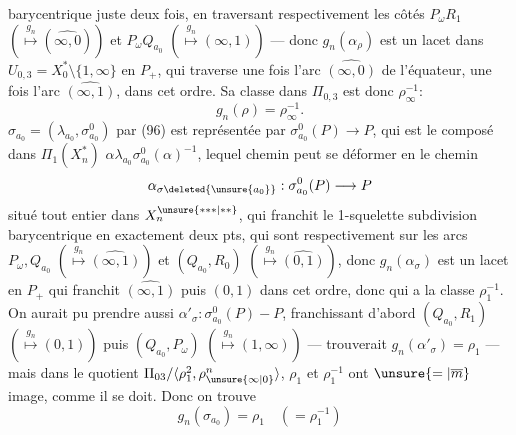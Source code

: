 barycentrique juste deux fois,  en traversant respectivement les côtés $P_\omega R_1$ $(\overset{g_n}\longmapsto(\widehat{\infty,0}))$ et $P_\omega Q_{a_0}$ $(\overset{g_n}\longmapsto(\infty,1))$ — donc $g_n(\alpha_\rho)$ est un lacet dans $U_{0,3}=X_0^*\setminus\{1,\infty\}$  en $P_+$, qui  traverse une fois l'arc $\widehat{(\infty,0)}$ de l'équateur, une fois l'arc $\widehat{(\infty,1)}$, dans cet ordre. Sa classe dans $\Pi_{0,3}$ est donc $\rho_\infty^{-1}$:
\[
\tag{*} g_n(\rho)=\rho_\infty^{-1}.
\]
  $\sigma_{a_0}=(\lambda_{a_0},\sigma^0_{a_0})$ par (96) est représentée par $\sigma^0_{a_0}(P)\longrightarrow P$, qui est le composé dans $\Pi_1(X_n^*)$  $\alpha\lambda_{a_0}\sigma^0_{a_0}(\alpha)^{-1}$, lequel chemin peut se déformer en le chemin 
\[
\alpha_{\sigma\deleted{\unsure{a_0}}}:\sigma^0_{a_0}(P)\longrightarrow P
\]
situé tout entier dans $X_n^{\unsure{***|**}}$, qui franchit le 1-squelette  subdivision barycentrique en exactement deux pts, qui sont respectivement sur les arcs $P_\omega,Q_{a_0}$ $(\overset{g_n}\longmapsto\widehat{(\infty,1)})$ et $(Q_{a_0},R_0)$ $(\overset{g_n}\longmapsto\widehat{(0,1)})$, donc $g_n(\alpha_\sigma)$ est un lacet en $P_+$ qui franchit $\widehat{(\infty,1)}$ puis $\widehat{(0,1)}$ dans cet ordre, donc qui  a la classe $\rho_1^{-1}$. On aurait pu prendre aussi $\alpha'_\sigma:\sigma^0_{a_0}(P)\mathbin{-}P$, franchissant d'abord $(Q_{a_0},R_1)$ $(\overset{g_n}\longmapsto\widehat{(0,1)})$ puis $(Q_{a_0},P_\omega)$ $(\overset{g_n}\longmapsto(1,\infty))$ —  trouverait $g_n(\alpha'_\sigma)=\rho_1$ — mais dans le quotient $\Pi_{03}/\langle\rho_1^2,\rho_{\unsure{\infty|0}}^n\rangle$, $\rho_1$ et $\rho_1^{-1}$ ont $\unsure{=|\overline m}$ image, comme il se doit. Donc on trouve
\[
\tag{bis} g_n(\sigma_{a_0})=\rho_1\quad(=\rho_1^{-1})
\]

